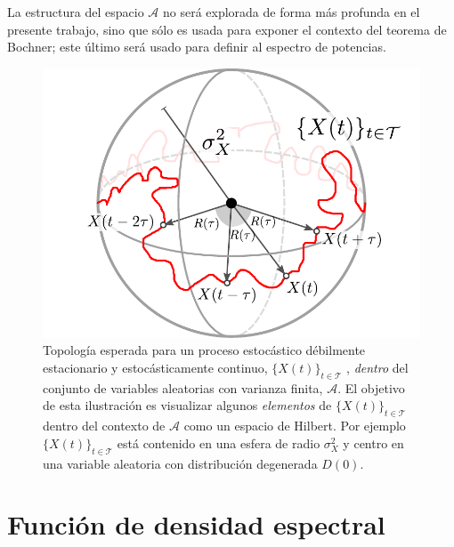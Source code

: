 \documentclass[12pt,letterpaper]{book}
\newcommand{\xt}{$\{X(t)\}_{t\in \mathcal{T}}$ }
\begin{document}
La estructura del espacio $\mathcal{A}$ no será explorada de forma más profunda en el presente trabajo, sino que sólo es usada para exponer el contexto del teorema de Bochner; este último será usado para definir al espectro de potencias.

\begin{figure}
\centering
\includegraphics[width=.6\textwidth]{./img_diagramas/esfera_v1.pdf}
\caption[Topología esperada para un proceso estocástico débilmente estacionario y estocásticamente continuo \textit{dentro} del espacio de variables aleatorias con varianza finita.]{Topología esperada para un proceso estocástico débilmente estacionario y estocásticamente continuo, \xt , \textit{dentro} del conjunto de variables aleatorias con varianza finita, $\mathcal{A}$.
%
El objetivo de esta ilustración es visualizar algunos \textit{elementos} de \xt dentro del contexto de $\mathcal{A}$ como un espacio de Hilbert. Por ejemplo \xt está contenido en una esfera de radio $\sigma_X^2$ y centro en una variable aleatoria con distribución degenerada $D(0)$.}
\end{figure}


\section{Función de densidad espectral}
\label{sec:fde}

%
\end{document}
